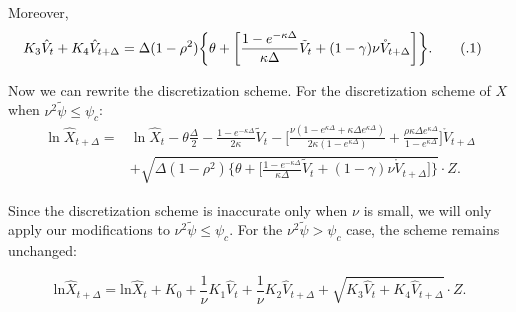 \documentclass{ws-ijfe}
\newcommand\numberthis{\addtocounter{equation}{1}\tag{\theequation}}
\begin{document}
Moreover,
\begin{align*}
&K_3\hat{V}_t+K_4\hat{V}_{t+\Delta}
=\Delta(1-\rho^2)\bigg\{\theta+\bigg[\frac{1-e^{-\kappa\Delta}}{\kappa\Delta}\tilde{V}_t+(1-\gamma)\nu \mathring{V}_{t+\Delta}\bigg]\bigg\}.\numberthis\label{QEK3K4}
\end{align*}

Now we can rewrite the discretization scheme.
For the discretization scheme of $X$ when $\nu^2\tilde{\psi} \leq \psi_c $:
\begin{equation}\label{newLnX}
\begin{split}
  \ln\hat{X}_{t+\Delta}=&\ln\hat{X}_t-\theta\frac{\Delta}{2}-\frac{1-e^{-\kappa\Delta}}{2\kappa}\tilde{V}_t-\bigg[\frac{\nu(1-e^{\kappa\Delta}+\kappa\Delta e^{\kappa\Delta})}{2\kappa(1-e^{\kappa\Delta})}+\frac{\rho\kappa\Delta e^{\kappa\Delta}}{1-e^{\kappa\Delta}}\bigg]\mathring{V}_{t+\Delta}\\
  &+\sqrt{\Delta(1-\rho^2)\bigg\{\theta+\bigg[\frac{1-e^{-\kappa\Delta}}{\kappa\Delta}\tilde{V}_t+(1-\gamma)\nu \mathring{V}_{t+\Delta}\bigg]\bigg\}}\cdot Z.
\end{split}
\end{equation}

Since the discretization scheme is inaccurate only when $\nu$ is small, we will only apply our modifications to $\nu^2\tilde{\psi} \leq \psi_c $. For the $\nu^2\tilde{\psi} > \psi_c $ case, the scheme remains unchanged:

\begin{equation}\label{newLnX2}
  \text{ln}\hat{X}_{t+\Delta}=\text{ln}\hat{X}_t+{K}_0+\frac{1}{\nu}{K}_1\hat{V}_t+\frac{1}{\nu}{K}_2\hat{V}_{t+\Delta}+\sqrt{{K}_3\hat{V}_t+{K}_4\hat{V}_{t+\Delta}}\cdot Z.
\end{equation}
\end{document}
